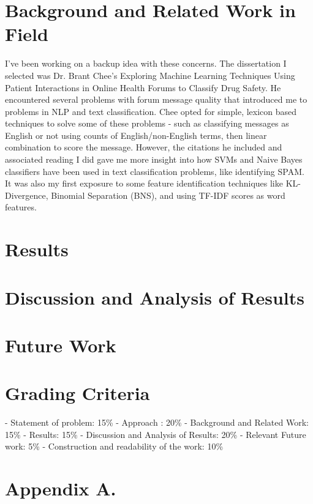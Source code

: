 \documentclass[twoside,11pt]{article}
\begin{document}
\section{Background and Related Work in Field}
I've been working on a backup idea with these concerns.  The dissertation I selected was Dr. Brant Chee's Exploring Machine Learning Techniques Using Patient Interactions in Online Health Forums to Classify Drug Safety.  He encountered several problems with forum message quality that introduced me to problems in NLP and text classification.  Chee opted for simple, lexicon based techniques to solve some of these problems - such as classifying messages as English or not using counts of English/non-English terms, then linear combination to score the message. However, the citations he included and associated reading I did gave me more insight into how SVMs and Naive Bayes classifiers have been used in text classification problems, like identifying SPAM.  It was also my first exposure to some feature identification techniques like KL-Divergence, Binomial Separation (BNS), and using TF-IDF scores as word features.

\section{Results}



\section{Discussion and Analysis of Results}



\section{Future Work}


\section{Grading Criteria}
- Statement of problem:  15\%
- Approach : 20\%
- Background and Related Work: 15\%
- Results: 15\%
- Discussion and Analysis of Results: 20\%
- Relevant Future work:  5\%
- Construction and readability of the work:  10\%






\newpage

\appendix
\section*{Appendix A.}
\label{app:theorem}
\end{document}
